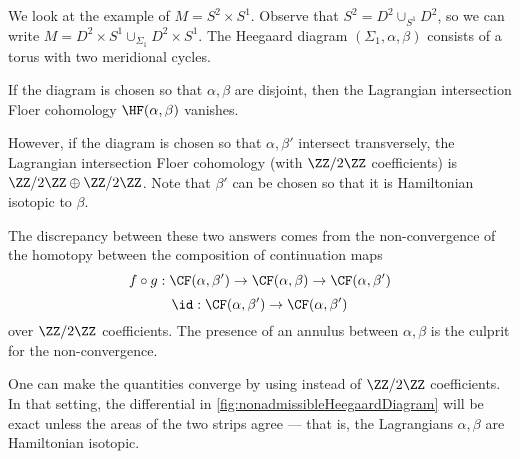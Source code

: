 
    We look at the example of $M=S^2\times S^1$. Observe that $S^2=D^2\cup_{S^1} D^2$, so we can write $M=D^2\times S^1 \cup_{\Sigma_1} D^2\times S^1$. 
    The Heegaard diagram $(\Sigma_1, \alpha, \beta)$ consists of a torus with two meridional cycles. 
    
    If the diagram is chosen so that $\alpha, \beta$ are disjoint, then the Lagrangian intersection Floer cohomology $\HF(\alpha, \beta)$ vanishes.
    
    However, if the diagram is chosen so that $\alpha, \beta'$ intersect transversely, the Lagrangian intersection Floer cohomology (with $\ZZ/2\ZZ$ coefficients) is $\ZZ/2\ZZ\oplus \ZZ/2\ZZ$. Note that $\beta'$ can be chosen so that it is Hamiltonian isotopic to $\beta$.
    
    The discrepancy between these two answers comes from the non-convergence of the homotopy between the composition of continuation maps  
    \[f\circ g:\CF(\alpha, \beta')\to \CF(\alpha, \beta) \to \CF(\alpha, \beta')\]
    \[\id: \CF(\alpha, \beta')\to \CF(\alpha, \beta')\]
    over $\ZZ/2\ZZ$ coefficients. The presence of an annulus between $\alpha, \beta$ is the culprit for the non-convergence.

    One can make the quantities converge by using   instead of $\ZZ/2\ZZ$ coefficients. In that setting, the differential in \cref{fig:nonadmissibleHeegaardDiagram} will be exact unless the areas of the two strips agree --- that is, the Lagrangians $\alpha, \beta$ are Hamiltonian isotopic.



